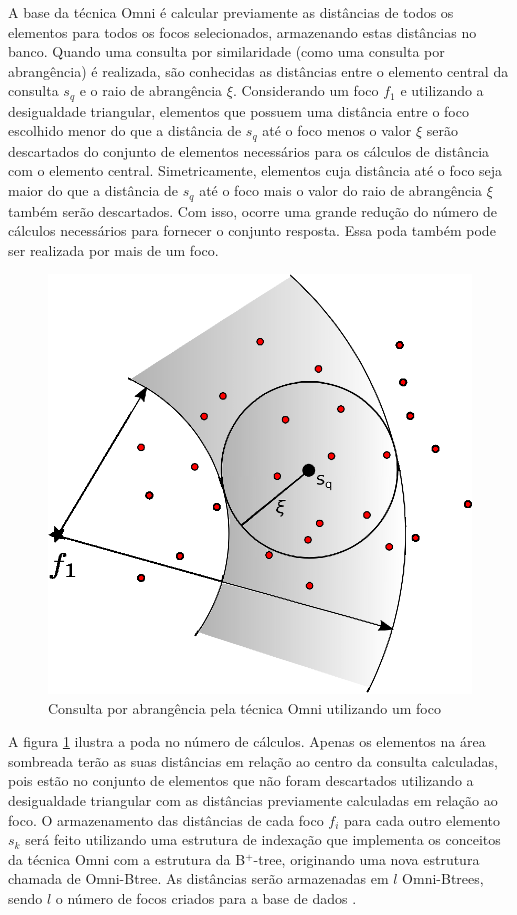 A base da técnica Omni é calcular previamente as distâncias de todos os elementos para todos os focos selecionados, armazenando estas distâncias no banco. Quando uma consulta por similaridade
(como uma consulta por abrangência) é realizada, são conhecidas as distâncias entre o elemento central da consulta $s_q$ e o raio de abrangência $\xi$. Considerando um foco ${f_1}$ e utilizando
a desigualdade triangular, elementos que possuem uma distância entre o foco escolhido menor do que a distância de $s_q$ até o foco menos o valor $\xi$ serão descartados do conjunto de elementos necessários para
os cálculos de distância com o elemento central. Simetricamente, elementos cuja distância até o foco seja maior do que a distância de $s_q$ até o foco mais o valor do raio de abrangência $\xi$ também
serão descartados. Com isso, ocorre uma grande redução do número de cálculos necessários para fornecer o conjunto resposta. Essa poda também pode ser realizada por mais de um foco.

\begin{figure}[H]
\centering
\captionsetup{width=0.50\textwidth, font=footnotesize, textfont=bf}
\includegraphics[width=.4\textwidth]{dados/figuras/rg_omni_1.eps}
\caption{Consulta por abrangência pela técnica Omni utilizando um foco}
\label{fig:rqomni1}
\end{figure}


A figura \ref{fig:rqomni1} ilustra a poda no número de cálculos. Apenas os elementos na área sombreada terão as suas distâncias em relação ao centro da consulta calculadas, pois estão no
conjunto de elementos que não foram descartados utilizando a desigualdade triangular com as distâncias previamente calculadas em relação ao foco. O armazenamento das distâncias de cada foco ${f_i}$ para cada outro elemento $s_k$ será feito 
utilizando uma estrutura de indexação que implementa os conceitos da técnica Omni com a estrutura da B$^+$-tree, originando uma nova estrutura chamada de Omni-Btree. As distâncias serão armazenadas em $l$ Omni-Btrees, sendo $l$ o número de focos
criados para a base de dados \cite{Traina2001}.


